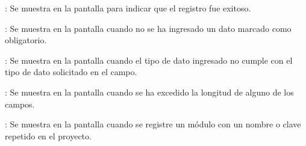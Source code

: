 \begin{Citemize}
	\item {}: Se muestra en la pantalla  para indicar que el registro fue exitoso.
	\item {}: Se muestra en la pantalla  cuando no se ha ingresado un dato marcado como obligatorio.
	\item {}: Se muestra en la pantalla  cuando el tipo de dato ingresado no cumple con el tipo de dato solicitado en el campo.
	\item {}: Se muestra en la pantalla  cuando se ha excedido la longitud de alguno de los campos.
	\item {}: Se muestra en la pantalla  cuando se registre un módulo con un nombre o clave repetido en el proyecto.
\end{Citemize}

